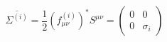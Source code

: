 \begin{equation}
\overline{\Sigma^{(i)}}=\frac{1}{2}\left(f^{(i)}_{\mu\nu}\right)^{*}S^{\mu\nu}
=\left(
\begin{array}{cc}
0&0\\
0&\sigma_i
\end{array}\right)
\end{equation}

